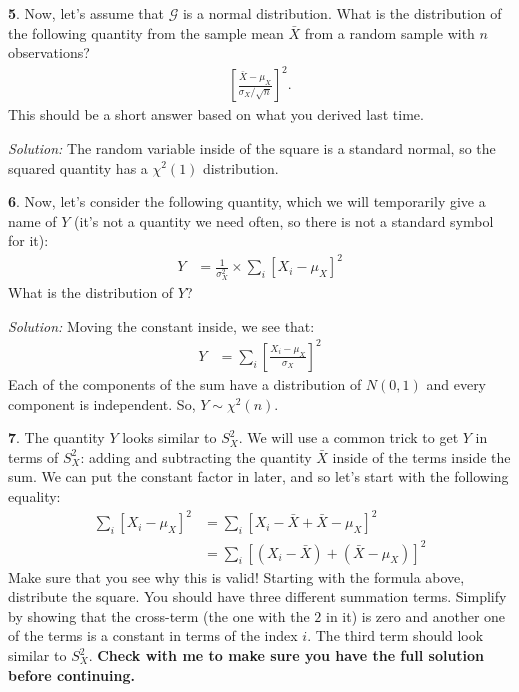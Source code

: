 \documentclass{tufte-handout}
\begin{document}
\textbf{5}. Now, let's assume that $\mathcal{G}$ is a normal distribution. What is the
distribution of the following quantity from the sample mean $\bar{X}$ from a
random sample with $n$ observations?
\begin{align*}
\left[\frac{\bar{X} - \mu_X}{\sigma_X / \sqrt{n}} \right]^2.
\end{align*}
This should be a short answer based on what you derived last time.

\textit{Solution:} The random variable inside of the square is a standard normal, so
the squared quantity has a $\chi^2(1)$ distribution.

\textbf{6}. Now, let's consider the following quantity, which we will temporarily
give a name of $Y$ (it's not a quantity we need often, so there is not
a standard symbol for it):
\begin{align*}
Y &= \frac{1}{\sigma_X^2} \times \sum_i \left[ X_i - \mu_X \right]^2 
\end{align*}
What is the distribution of $Y$?

\textit{Solution:} Moving the constant inside, we see that:
\begin{align*}
Y &=  \sum_i \left[ \frac{X_i - \mu_X}{\sigma_X} \right]^2 
\end{align*}
Each of the components of the sum have a distribution of $N(0, 1)$ and
every component is independent. So, $Y \sim \chi^2(n)$.

\textbf{7}. The quantity $Y$ looks similar to $S_X^2$. We will use a common trick to
get $Y$ in terms of $S_X^2$: adding and subtracting the quantity $\bar{X}$
inside of the terms inside the sum. We can put the constant factor in later,
and so let's start with the following equality:
\begin{align*}
\sum_i \left[ X_i - \mu_X \right]^2 &= \sum_i \left[ X_i - \bar{X} + \bar{X} - \mu_X \right]^2  \\
&= \sum_i \left[ (X_i - \bar{X}) + (\bar{X} - \mu_X) \right]^2 
\end{align*}
Make sure that you see why this is valid! Starting with the
formula above, distribute the square. You should have three different summation
terms. Simplify by showing that the cross-term (the one with the $2$ in it) is
zero and another one of the terms is a constant in terms of the index $i$. The
third term should look similar to $S_X^2$. \textbf{Check with me to make sure
you have the full solution before continuing.}
\end{document}
